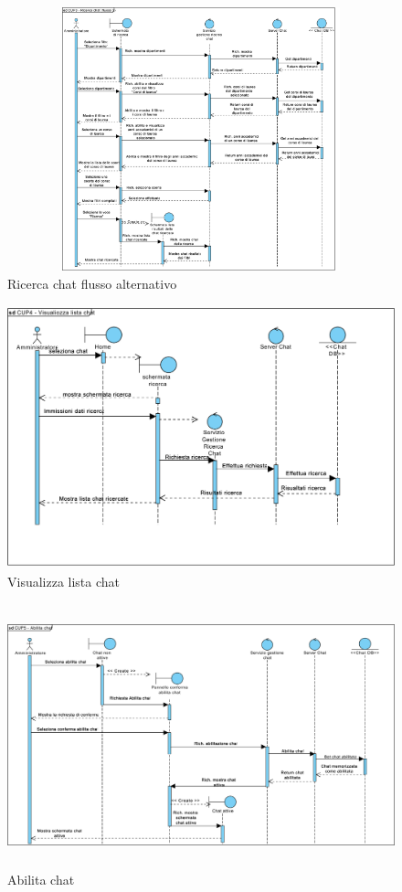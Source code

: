 \begin{figure}
	\centering
	\includegraphics[height=3in,width=5in]{imgs/gruppo6/sequence/CUP3_ricerca_chat_flusso_2.pdf}
	\caption{Ricerca chat flusso alternativo}
	\label{fig:prova}
\end{figure}

\begin{figure}
	\centering
	\includegraphics[height=3in,width=5in]{imgs/gruppo6/sequence/CUP4_visualizza_lista_chat.pdf}
	\caption{Visualizza lista chat}
	\label{fig:prova}
\end{figure}

\begin{figure}
	\centering
	\includegraphics[height=3in,width=5in]{imgs/gruppo6/sequence/CUP5_abilita_chat.pdf}
	\caption{Abilita chat}
	\label{fig:prova}
\end{figure}

